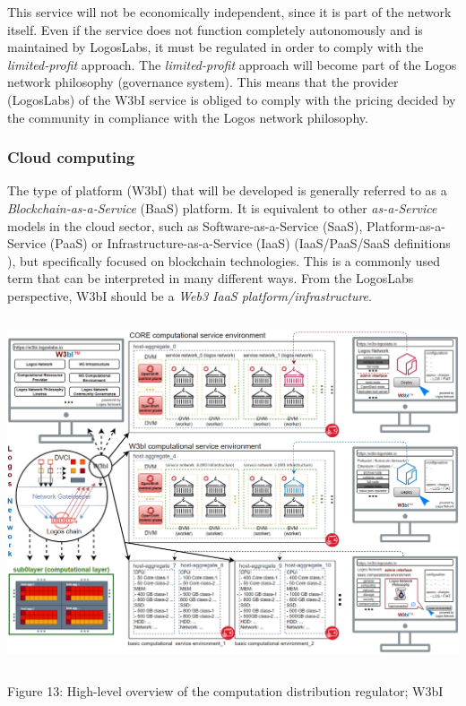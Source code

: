 \documentclass[]{article}
\begin{document}
This service will not be economically independent, since it is part of the network itself. 
Even if the service does not function completely autonomously and is maintained by LogosLabs, it must be regulated in order to comply with the \textit{limited-profit} approach.
The \textit{limited-profit} approach will become part of the Logos network philosophy (governance system).
This means that the provider (LogosLabs) of the W3bI service is obliged to comply with the pricing decided by the community in compliance with the Logos network philosophy.

\subsubsection{Cloud computing}
The type of platform (W3bI) that will be developed is generally referred to as a \textit{Blockchain-as-a-Service} (BaaS) \cite{baas} platform. 
It is equivalent to other \textit{as-a-Service} models in the cloud sector, such as Software-as-a-Service (SaaS), Platform-as-a-Service (PaaS) or Infrastructure-as-a-Service (IaaS) (IaaS/PaaS/SaaS definitions \cite{iaas-paas-saas}), but specifically focused on blockchain technologies.
This is a commonly used term that can be interpreted in many different ways.  
From the LogosLabs perspective, W3bI should be a \textit{Web3 IaaS platform/infrastructure}.

\begin{center}
	\includegraphics[height=10.3cm]{w3bi-overview}
\end{center}
\begin{center}
	Figure 13: High-level overview of the computation distribution regulator; W3bI
\end{center}
\end{document}
